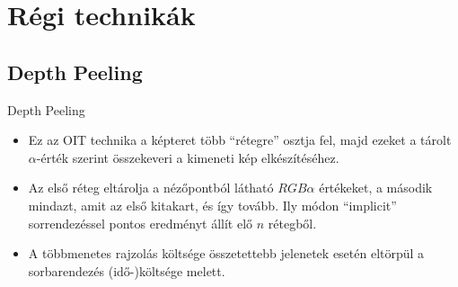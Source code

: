 \documentclass{beamer}
\begin{document}
\section{Régi technikák}
\subsection{Depth Peeling}
\begin{frame}{Depth Peeling}
	\begin{itemize}
		\item Ez az OIT technika a képteret több ``rétegre'' osztja fel, majd ezeket a tárolt $\alpha$-érték szerint összekeveri a kimeneti kép elkészítéséhez.
		\item Az első réteg eltárolja a nézőpontból látható $RGB\alpha$ értékeket, a második mindazt, amit az első kitakart, és így tovább. Ily módon ``implicit'' sorrendezéssel pontos eredményt állít elő $n$ rétegből.
		\item A többmenetes rajzolás költsége összetettebb jelenetek esetén eltörpül a sorbarendezés (idő-)költsége melett.
	\end{itemize}
		
\end{frame}
	
\end{document}

